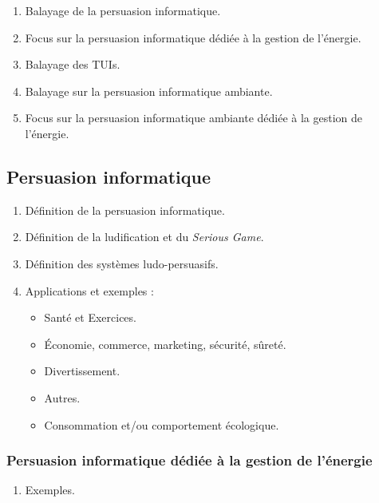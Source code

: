 \documentclass[10pt,a5paper,twoside]{article}
\begin{document}
\begin{enumerate}
\def\labelenumi{\arabic{enumi}.}
\itemsep1pt\parskip0pt
\item
  Balayage de la persuasion informatique.
\item
  Focus sur la persuasion informatique dédiée à la gestion de l'énergie.
\item
  Balayage des TUIs.
\item
  Balayage sur la persuasion informatique ambiante.
\item
  Focus sur la persuasion informatique ambiante dédiée à la gestion de
  l'énergie.
\end{enumerate}

\subsection{Persuasion informatique}\label{persuasion-informatique}

\begin{enumerate}
\def\labelenumi{\arabic{enumi}.}
\itemsep1pt\parskip0pt
\item
  Définition de la persuasion informatique.
\item
  Définition de la ludification et du \emph{Serious Game}.
\item
  Définition des systèmes ludo-persuasifs.
\item
  Applications et exemples :

  \begin{itemize}
  \itemsep1pt\parskip0pt
  \item
    Santé et Exercices.
  \item
    Économie, commerce, marketing, sécurité, sûreté.
  \item
    Divertissement.
  \item
    Autres.
  \item
    Consommation et/ou comportement écologique.
  \end{itemize}
\end{enumerate}

\subsubsection{Persuasion informatique dédiée à la gestion de
l'énergie}\label{persuasion-informatique-duxe9diuxe9e-uxe0-la-gestion-de-luxe9nergie}

\begin{enumerate}
\def\labelenumi{\arabic{enumi}.}
\itemsep1pt\parskip0pt
\item
  Exemples.
\end{enumerate}
\end{document}
